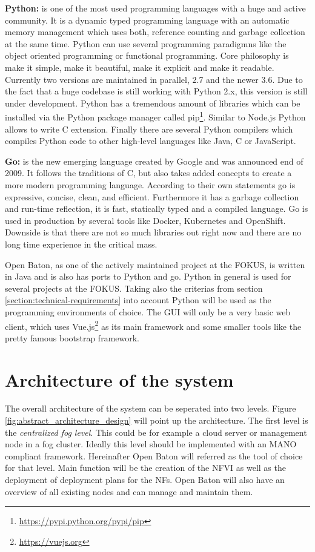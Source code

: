 \textbf{Python:} is one of the most used programming languages with a huge and active community.\autocite[cf.]{ProgramminLanguage:2017}
It is a dynamic typed programming language with an automatic memory management which uses both, reference counting and garbage collection at the same time.\autocite[cf.]{Python:GarbageCollection}
Python can use several programming paradigmns like the object oriented programming or functional programming.
Core philosophy is make it simple, make it beautiful, make it explicit and make it readable.
Currently two versions are maintained in parallel, 2.7 and the newer 3.6.
Due to the fact that a huge codebase is still working with Python 2.x, this version is still under development.\autocite[cf.]{Peterson:PythonReleaseSchedule}
Python has a tremendous amount of libraries which can be installed via the Python package manager called pip\footnote{\url{https://pypi.python.org/pypi/pip}}.
Similar to Node.js Python allows to write C extension.
Finally there are several Python compilers which compiles Python code to other high-level languages like Java, C or JavaScript.

\textbf{Go:} is the new emerging language created by Google and was announced end of 2009.
It follows the traditions of C, but also takes added concepts to create a more modern programming language.
According to their own statements go is expressive, concise, clean, and efficient.\autocite[cf.]{Go:Documentation}
Furthermore it has a garbage collection and run-time reflection, it is fast, statically typed and a compiled language.\autocite[cf.]{Go:Documentation}
Go is used in production by several tools like Docker, Kubernetes and OpenShift.
Downside is that there are not so much libraries out right now and there are no long time experience in the critical mass.

Open Baton, as one of the actively maintained project at the \ac{FOKUS}, is written in Java and is also has ports to Python and go.
Python in general is used for several projects at the \ac{FOKUS}.
Taking also the criterias from section \ref{section:technical-requirements} into account Python will be used as the  programming environments of choice.
The \ac{GUI} will only be a very basic web client, which uses Vue.js\footnote{\url{https://vuejs.org}} as its main framework and some smaller tools like the pretty famous bootstrap framework.

\section{Architecture of the system}
The overall architecture of the system can be seperated into two levels.
Figure \ref{fig:abstract_architecture_design} will point up the architecture.
The first level is the \textit{centralized fog level}.
This could be for example a cloud server or management node in a fog cluster.
Ideally this level should be implemented with an \ac{MANO} compliant framework.
Hereinafter Open Baton will referred as the tool of choice for that level.
Main function will be the creation of the \ac{NFVI} as well as the deployment of deployment plans for the \acp{NF}.
Open Baton will also have an overview of all existing nodes and can manage and maintain them.

